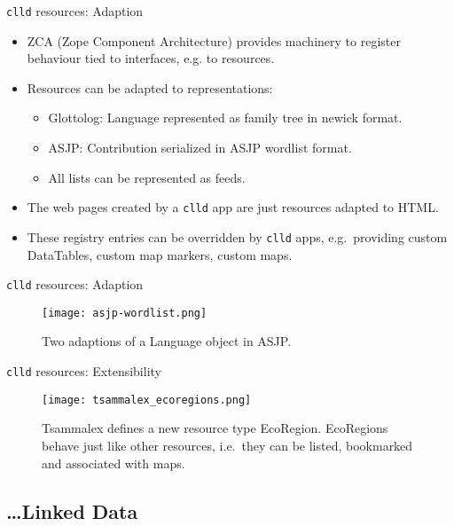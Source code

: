 \documentclass{beamer}
\begin{document}
%
%
\begin{frame}{\texttt{clld} resources: Adaption}
\begin{itemize}
\item ZCA (Zope Component Architecture) provides machinery to register behaviour tied to
interfaces, e.g. to resources.
\item Resources can be adapted to representations:
\begin{itemize}
\item Glottolog: Language represented as family tree in newick format.
\item ASJP: Contribution serialized in ASJP wordlist format.
\item All lists can be represented as feeds.
\end{itemize}
\item The web pages created by a \texttt{clld} app are just resources
adapted to HTML.
\item These registry entries can be overridden by \texttt{clld} apps,
e.g.~providing custom DataTables, custom map markers, custom maps.
\end{itemize}
\end{frame}


\begin{frame}{\texttt{clld} resources: Adaption}
\begin{figure}
\texttt{[image: asjp-wordlist.png]}
\caption{\label{fig:asjp}Two adaptions of a Language object in ASJP.}
\end{figure}
\end{frame}


\begin{frame}{\texttt{clld} resources: Extensibility}
\begin{figure}
\texttt{[image: tsammalex\_ecoregions.png]}
\caption{\label{fig:ecoregions}Tsammalex defines a new resource type EcoRegion.
EcoRegions behave just
like other resources, i.e.~they can be listed, bookmarked and
associated with maps.}
\end{figure}
\end{frame}


\subsection{\dots Linked Data}
\end{document}
